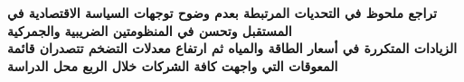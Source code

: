 \textbf{تراجع ملحوظ في التحديات المرتبطة بعدم وضوح توجهات السياسة الاقتصادية في المستقبل وتحسن في المنظومتين الضريبية والجمركية}\\
\textbf{الزيادات المتكررة في أسعار الطاقة والمياه ثم ارتفاع معدلات التضخم تتصدران قائمة المعوقات التي واجهت كافة الشركات خلال الربع محل الدراسة}
